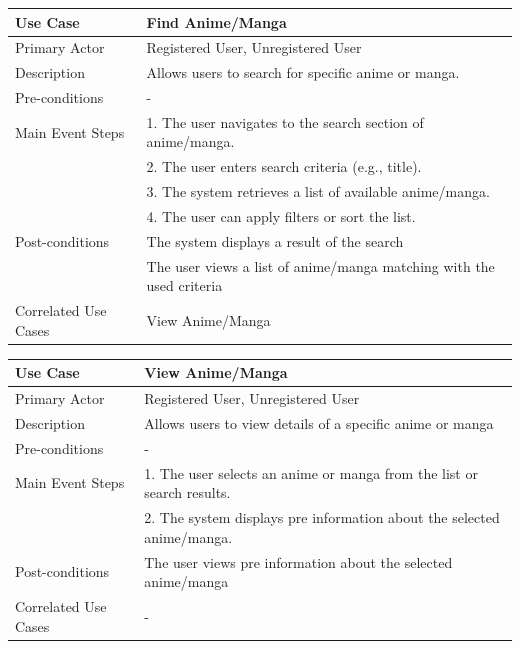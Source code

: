 \begin{longtable}{|p{}|p{}|}
    \hline
    \rowcolor{lightblue}
    \textbf{Use Case} & \textbf{Find Anime/Manga} \\
    \hline
    Primary Actor & Registered User, Unregistered User\\
    \hline
    Description & Allows users to search for specific anime or manga. \\
    \hline
    Pre-conditions & - \\
    \hline
    Main Event Steps &  1. The user navigates to the search section of anime/manga. \\
    & 2. The user enters search criteria (e.g., title). \\
    & 3. The system retrieves a list of available anime/manga. \\
    & 4. The user can apply filters or sort the list. \\
    \hline
    Post-conditions & The system displays a result of the search \\
    & The user views a list of anime/manga matching with the used criteria\\
    \hline
    Correlated Use Cases &View Anime/Manga \\
    \hline
\end{longtable}


\begin{longtable}{|p{}|p{}|}
    \hline
    \rowcolor{lightblue}
    \textbf{Use Case} & \textbf{View Anime/Manga} \\
    \hline
    Primary Actor & Registered User, Unregistered User\\
    \hline
    Description &Allows users to view details of a specific anime or manga \\
    \hline
    Pre-conditions & -\\
    \hline
    Main Event Steps & 1. The user selects an anime or manga from the list or search results.\\
    & 2. The system displays pre information about the selected anime/manga. \\
    \hline
    Post-conditions & The user views pre information about the selected anime/manga\\
    \hline
    Correlated Use Cases & -\\
    \hline
\end{longtable}


